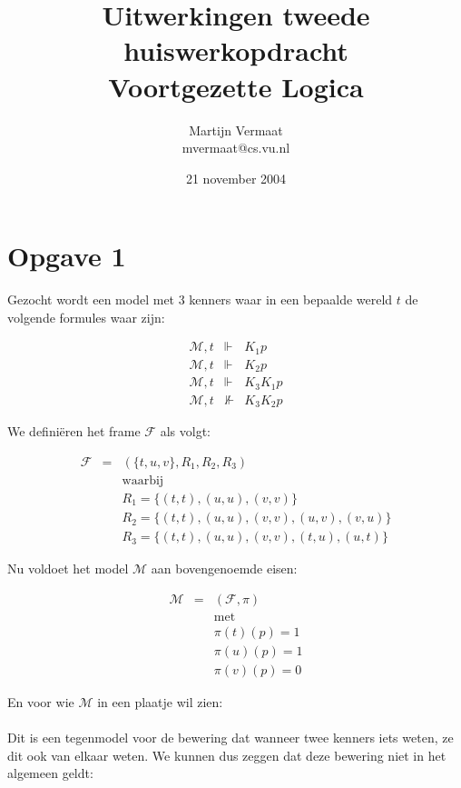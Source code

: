 \documentclass[a4paper,11pt]{article}
\title{Uitwerkingen tweede huiswerkopdracht\\Voortgezette Logica}
\author{
    Martijn Vermaat\\
    mvermaat@cs.vu.nl
}
\date{21 november 2004}
\begin{document}
\maketitle


\section*{Opgave 1}

Gezocht wordt een model met 3 kenners waar in een bepaalde wereld
$t$ de volgende formules waar zijn:

\begin{eqnarray*}
\mathcal{M},t & \Vdash & K_{1} p        \\
\mathcal{M},t & \Vdash & K_{2} p        \\
\mathcal{M},t & \Vdash & K_{3} K_{1} p  \\
\mathcal{M},t & \nVdash & K_{3} K_{2} p
\end{eqnarray*}

We defini\"eren het frame $\mathcal{F}$ als volgt:

\begin{eqnarray*}
\mathcal{F} & = & (\{t,u,v\}, R_{1}, R_{2}, R_{3}) \\
& & \mbox{waarbij}                                 \\
& & R_{1} = \{(t,t), (u,u), (v,v)\}                \\
& & R_{2} = \{(t,t), (u,u), (v,v), (u,v), (v,u)\}  \\
& & R_{3} = \{(t,t), (u,u), (v,v), (t,u), (u,t)\}
\end{eqnarray*}

Nu voldoet het model $\mathcal{M}$ aan bovengenoemde eisen:

\begin{eqnarray*}
\mathcal{M} & = & (\mathcal{F}, \pi) \\
& & \mbox{met}                       \\
& & \pi(t)(p) = 1                    \\
& & \pi(u)(p) = 1                    \\
& & \pi(v)(p) = 0
\end{eqnarray*}

En voor wie $\mathcal{M}$ in een plaatje wil zien:\\[1em]

\\[1em]

Dit is een tegenmodel voor de bewering dat wanneer twee kenners iets
weten, ze dit ook van elkaar weten. We kunnen dus zeggen dat deze
bewering niet in het algemeen geldt:
\end{document}
